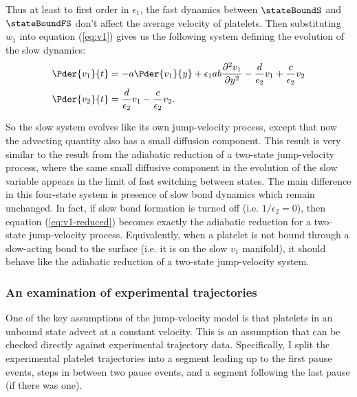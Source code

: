 Thus at least to first order in $\epsilon_1$, the fast dynamics
between $\stateBoundS$ and $\stateBoundFS$ don't affect the average
velocity of platelets. Then substituting $w_1$ into equation
(\ref{eq:v1}) gives us the following system defining the evolution of
the slow dynamics:
\begin{align}
  \label{eq:v1-reduced}
  \Pder{v_1}{t} &= -a \Pder{v_1}{y} + \epsilon_1 a b \frac{\partial^2
                  v_1}{\partial y^2} - \frac{d}{\epsilon_2} v_1 +
                  \frac{c}{\epsilon_2} v_2 \\
  \label{eq:v2-reduced}
  \Pder{v_2}{t} &= \frac{d}{\epsilon_2} v_1 - \frac{c}{\epsilon_2} v_2.
\end{align}


So the slow system evolves like its own jump-velocity process, except
that now the advecting quantity also has a small diffusion
component. This result is very similar to the result from the
adiabatic reduction of a two-state jump-velocity process, where the
same small diffusive component in the evolution of the slow variable
appears in the limit of fast switching between states. The main
difference in this four-state system is presence of slow bond dynamics
which remain unchanged. In fact, if slow bond formation is turned off
(i.e. $1/\epsilon_2 = 0$), then equation (\ref{eq:v1-reduced}) becomes
exactly the adiabatic reduction for a two-state jump-velocity
process. Equivalently, when a platelet is not bound through a
slow-acting bond to the surface (i.e. it is on the slow $v_1$
manifold), it should behave like the adiabatic reduction of a
two-state jump-velocity system.



\subsubsection{An examination of experimental trajectories}
\label{sec:an-exam-exper}

One of the key assumptions of the jump-velocity model is that
platelets in an unbound state advect at a constant velocity. This is
an assumption that can be checked directly against experimental
trajectory data. Specifically, I split the experimental platelet
trajectories into a segment leading up to the first pause events,
steps in between two pause events, and a segment following the last
pause (if there was one).

